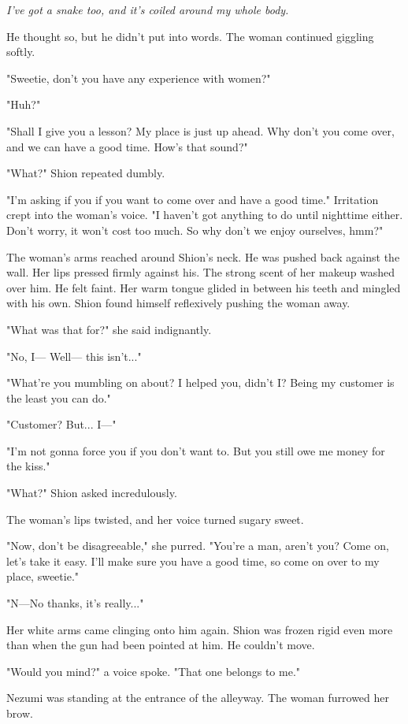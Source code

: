 \emph{I've got a snake too, and it's coiled around my whole body.}

He thought so, but he didn't put into words. The woman continued
giggling softly.

"Sweetie, don't you have any experience with women?"

"Huh?"

"Shall I give you a lesson? My place is just up ahead. Why don't you
come over, and we can have a good time. How's that sound?"

"What?" Shion repeated dumbly.

"I'm asking if you if you want to come over and have a good time."
Irritation crept into the woman's voice. "I haven't got anything to do
until nighttime either. Don't worry, it won't cost too much. So why
don't we enjoy ourselves, hmm?"

The woman's arms reached around Shion's neck. He was pushed back against
the wall. Her lips pressed firmly against his. The strong scent of her
makeup washed over him. He felt faint. Her warm tongue glided in between
his teeth and mingled with his own. Shion found himself reflexively
pushing the woman away.

"What was that for?" she said indignantly.

"No, I--- Well--- this isn't..."

"What're you mumbling on about? I helped you, didn't I? Being my
customer is the least you can do."

"Customer? But... I---"

"I'm not gonna force you if you don't want to. But you still owe me
money for the kiss."

"What?" Shion asked incredulously.

The woman's lips twisted, and her voice turned sugary sweet.

"Now, don't be disagreeable," she purred. "You're a man, aren't you?
Come on, let's take it easy. I'll make sure you have a good time, so
come on over to my place, sweetie."

"N---No thanks, it's really..."

Her white arms came clinging onto him again. Shion was frozen rigid even
more than when the gun had been pointed at him. He couldn't move.

"Would you mind?" a voice spoke. "That one belongs to me."

Nezumi was standing at the entrance of the alleyway. The woman furrowed
her brow.

